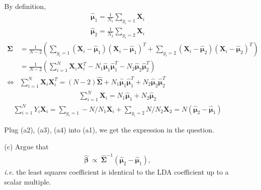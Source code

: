 \documentclass[10pt]{article}
\theoremstyle{definition}
\theoremstyle{remark}
\newcommand{\bX}{\bm{X}}
\newcommand{\bbeta}{\bm{\beta}}
\newcommand{\bmu}{\bm{\mu}}
\newcommand{\bSigma}{\bm{\Sigma}}
\begin{document}
\begin{enumerate}
\begin{itemize}
		By definition,
		\begin{align*}
		    \widehat{\bmu}_{1} = \frac{1}{N_1}\sum_{g_i=1} \bX_i \\
		    \widehat{\bmu}_{2} = \frac{1}{N_2}\sum_{g_i=2} \bX_i
		\end{align*}
		\begin{align*}
		    \widehat{\bSigma} & = \frac{1}{N-2} \left( \sum_{g_i=1} (\bX_i-\widehat{\bmu}_{1}) (\bX_i-\widehat{\bmu}_{1})^T + \sum_{g_i=2} (\bX_i-\widehat{\bmu}_{2}) (\bX_i-\widehat{\bmu}_{2})^T \right) \\
		    & = \frac{1}{N-2} \left( \sum_{i=1}^{N} \bX_i\bX_i^T - N_1\widehat{\bmu}_{1}\widehat{\bmu}_{1}^T - N_2\widehat{\bmu}_{2}\widehat{\bmu}_{2}^T \right) \\ 
		    \iff & \sum_{i=1}^{N} \bX_i\bX_i^T = (N-2) \widehat{\bSigma} + N_1\widehat{\bmu}_{1}\widehat{\bmu}_{1}^T + N_2\widehat{\bmu}_{2}\widehat{\bmu}_{2}^T \tag{a2}
		\end{align*}
		\begin{align*}
		    \sum_{i=1}^{N} \bX_i = N_1\widehat{\bmu}_{1} + N_2\widehat{\bmu}_{2} \tag{a3}
		\end{align*}
		\begin{align*}
		    \sum_{i=1}^{N} Y_i\bX_i = \sum_{g_i=1} -N/N_1\bX_i + \sum_{g_i=2} N/N_2\bX_2 = N(\widehat{\bmu}_{2}-\widehat{\bmu}_{1}) \tag{a4}
		\end{align*}
		
		Plug (a2), (a3), (a4) into (a1), we get the expression in the question.
	
		\item [(c)] Argue that 
		\begin{align}
		\widehat{\bbeta}\ \propto\ \widehat{\bSigma}^{-1}(\widehat{\bmu}_{2} - \widehat{\bmu}_{1}),\label{eq_lda_lse}
		\end{align}
		\textit{i.e.} the least squares coefficient is identical to the LDA coefficient up to a scalar multiple.
		

\end{itemize}
\end{enumerate}
\end{document}
